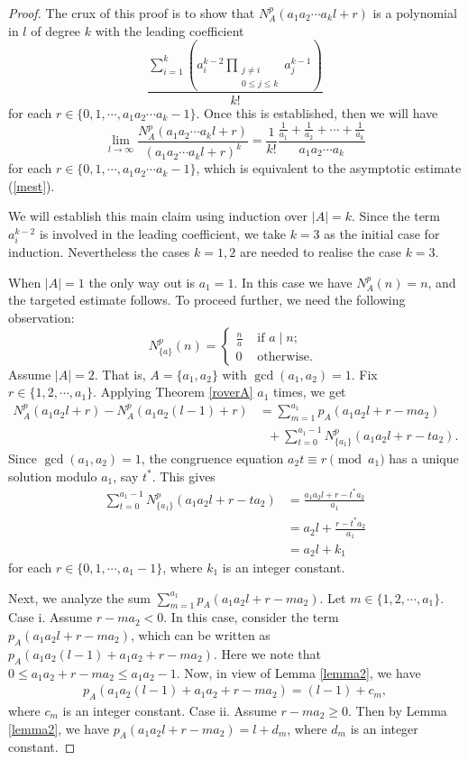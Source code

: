\documentclass[11pt]{article}
\begin{document}
\begin{proof}
The crux of this proof is to show that $N_A^p(a_1a_2\cdots a_kl+r)$ is a polynomial in $l$ of degree $k$ with the leading coefficient \[\frac{\sum_{i=1}^{k}\left(a_i^{k-2}\prod_{\substack{j\neq i\\ 0\leq j\leq k}}a_j^{k-1}\right)}{k!}\] for each $r\in\{0,1,\cdots ,a_1a_2\cdots a_k-1\}$. Once this is established, then we will have
\[\lim_{l\to\infty}\frac{N^p_A(a_1a_2\cdots a_kl+r)}{(a_1a_2\cdots a_kl+r)^{k}}=\frac{1}{k!}\frac{\frac{1}{a_1}+\frac{1}{a_2}+\cdots +\frac{1}{a_k}}{a_1a_2\cdots a_k}
\]
for each $r\in\{0,1,\cdots ,a_1a_2\cdots a_k-1\}$, which is equivalent to the asymptotic estimate (\ref{mest}).

We will establish this main claim using induction over $|A|=k$. Since the term $a_i^{k-2}$ is involved in the leading coefficient, we take $k=3$ as the initial case for induction. Nevertheless the cases $k=1,2$ are needed to realise the case $k=3$. 

When $|A|=1$ the only way out is $a_1=1$. In this case we have $N_A^p(n)=n$, and the targeted estimate follows. To proceed further, we need the following observation: 
\[
N_{\{a\}}^p(n)=\begin{cases}\frac{n}{a} &\text{ if }a\mid n;\\
0&\text{ otherwise. }
\end{cases}
\]
Assume  $|A|=2$. That is, $A=\{a_1,a_2\}$ with $\gcd(a_1,a_2)=1$.
Fix $r\in\{1,2,\cdots ,a_1\}$. Applying Theorem \ref{roverA} $a_1$ times, we get
\begin{align*}
N_A^p(a_1a_2l+r)-N_A^p(a_1a_2(l-1)+r)&=\sum_{m=1}^{a_1}p_A(a_1a_2l+r-ma_2)\\ &\ \ \ +\sum_{t=0}^{a_1-1}N_{\{a_1\}}^p(a_1a_2l+r-ta_2).
\end{align*}
Since $\gcd(a_1,a_2)=1$, the congruence equation $a_2t\equiv r\pmod {a_1}$ has a unique solution modulo $a_1$, say $t^*$. This gives
\begin{align*}
\sum_{t=0}^{a_1-1}N_{\{a_1\}}^p(a_1a_2l+r-ta_2)&=\frac{a_1a_2l+r-t^*a_2}{a_1}\\ 
&=a_2l+\frac{r-t^*a_2}{a_1}\\
&=a_2l+k_1
\end{align*}
for each $r\in\{0,1,\cdots ,a_1-1\}$, where $k_1$ is an integer constant.

Next, we analyze the sum $\sum_{m=1}^{a_1}p_A(a_1a_2l+r-ma_2)$. Let $m\in\{1,2,\cdots ,a_1\}$. \newline 
Case i. Assume $r-ma_2<0$. In this case, consider the term $p_A(a_1a_2l+r-ma_2)$, which can be written as $p_A(a_1a_2(l-1)+a_1a_2+r-ma_2)$. Here we note that $0\leq a_1a_2+r-ma_2\leq a_1a_2-1$. Now, in view of Lemma \ref{lemma2}, we have
\begin{align*}
p_A(a_1a_2(l-1)+a_1a_2+r-ma_2)=(l-1)+c_m,
\end{align*}
where $c_m$ is an integer constant.\newline 
Case ii. Assume $r-ma_2\geq 0$. Then by Lemma \ref{lemma2}, we have $p_A(a_1a_2l+r-ma_2)=l+d_m$,
where $d_m$ is an integer constant.


\end{proof}
\end{document}
